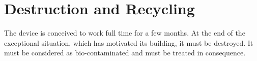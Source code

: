 \section{Destruction and Recycling}
    The device is conceived to work full time for a few months. At the end of the exceptional situation, which has motivated its building, it must be destroyed. It must be considered as bio-contaminated and must be treated in consequence.
